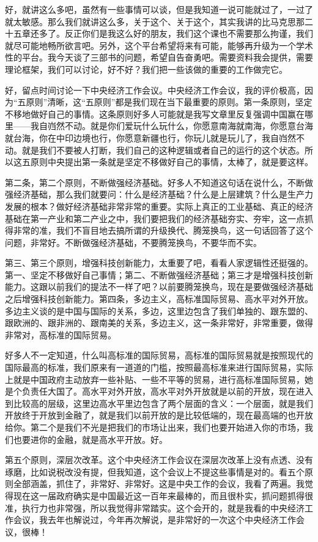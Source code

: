 \documentclass[UTF8, 12pt, a4paper]{ctexrep}
\begin{document}
好，就讲这么多吧，虽然有一些事情可以谈，但是我知道一说可能就过了，一过了就太敏感。那么我们就讲这么多，关于这个、关于这个，其实我讲的比马克思那二十五章还多了。反正你们是我这么好的朋友，我们这个课也不需要那么拘谨，我们就尽可能地畅所欲言吧。另外，这个平台希望将来有可能，能够再升级为一个学术性的平台。我今天谈了三部书的问题，希望自告奋勇吧。需要资料我会提供，需要理论框架，我们可以讨论，好不好？我们把一些该做的重要的工作做完它。

好，留点时间讨论一下中央经济工作会议。中央经济工作会议，我的评价极高，因为“五原则”清晰，这“五原则”都是我们现在当下最重要的原则。第一条原则，坚定不移地做好自己的事情。这条原则好多人可能就是我写文章里反复强调中国赢在哪里——我自岿然不动。就是你们爱玩什么玩什么，你愿意南海就南海，你愿意台海就台海，你在中印边境也行，你愿意新疆也行，你玩儿就是玩儿了，我自岿然不动。就是我们不要被人打断，我们自己的这种逻辑或者自己的运行的这个状态。所以这五原则中央提出第一条就是坚定不移做好自己的事情，太棒了，就是要这样。

第二条，第二个原则，不断做强经济基础。好多人不知道这句话在说什么，不断做强经济基础，那么我们就要问：什么是经济基础？什么是上层建筑？什么是生产力发展的根本？做好经济基础非常非常的重要。实际上真正的工业基础、真正的经济基础在第一产业和第二产业之中，我们要把我们的经济基础夯实、夯牢，这一点抓得非常的准，我们不盲目地去搞所谓的升级换代、腾笼换鸟，这一句话回答了这个问题，非常好。不断做强经济基础，不要腾笼换鸟，不要华而不实。

第三、第三个原则，增强科技创新能力，太重要了吧，看看人家逻辑性还挺强的。第一、坚定不移做好自己事情；第二、不断做强经济基础；第三才是增强科技创新能力。这跟以前我们的提法不一样了吧？以前要腾笼换鸟，现在是要做强经济基础之后增强科技创新能力。第四条，多边主义，高标准国际贸易、高水平对外开放。多边主义谈的是中国与国际的关系，多边，这里边包含了我们单独的、跟东盟的、跟欧洲的、跟非洲的、跟南美的关系，多边主义，这一条非常好，非常重要，做得非常对，高标准的国际贸易。

好多人不一定知道，什么叫高标准的国际贸易，高标准的国际贸易就是按照现代的国际最高的标准，我们原来有一道道的门槛，按照最高标准来进行国际贸易，实际上就是中国政府主动放弃一些补贴、一些不平等的贸易，进行高标准国际贸易，她是个负责任大国了。高水平对外开放，高水平对外开放就是以前的开放，现在进入到比较高的层级，这里边高水平里边包含了两个层面的含义：一个层面，就是我们开放终于开放到金融了，就是我们以前开放的是比较低端的，现在最高端的也开放给你。第二个是我们不光是把我们的市场让出来，我们也要开始进入你的市场，我们也要进你的金融，就是高水平开放。好。

第五个原则，深层次改革。这个中央经济工作会议在深层次改革上没有点透、没有琢磨，比如说税改没有提，但我知道，这个会议上不提这些事情是对的。看五个原则全部涵盖，抓住了，非常好、非常好。这是中央工作的会议，我看了两遍。我觉得现在这一届政府确实是中国最近这一百年来最棒的，而且很朴实，抓问题抓得很准，执行力也非常强，所以我觉得非常踏实。这个会开的，就是我看的中央经济工作会议，我去年也解说过，今年再次解说，是非常好的一次这个中央经济工作会议，很棒！
\end{document}
